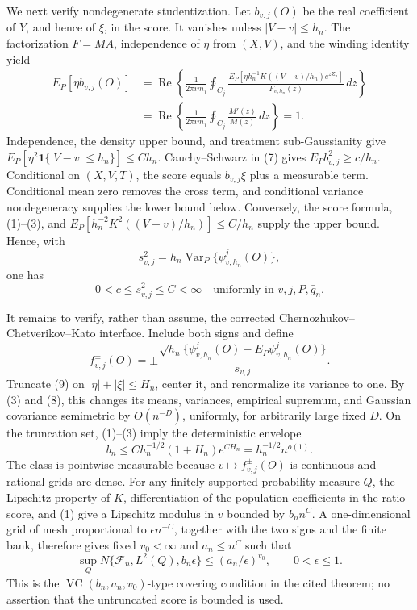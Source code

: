 We next verify nondegenerate studentization.  Let \(b_{v,j}(O)\) be the real coefficient of \(Y\), and hence of \(\xi\), in the score.  It vanishes unless \(|V-v|\le h_n\).  The factorization \(F=MA\), independence of \(\eta\) from \((X,V)\), and the winding identity yield
\[
 \begin{aligned}
 E_P[\eta b_{v,j}(O)]
 &=\operatorname{Re}\left\{\frac1{2\pi i m_j}\oint_{C_j}
 \frac{E_P[\eta h_n^{-1}K((V-v)/h_n)e^{zZ_n}]}{F_{v,h_n}(z)}\,dz\right\}\\
 &=\operatorname{Re}\left\{\frac1{2\pi i m_j}\oint_{C_j}\frac{M'(z)}{M(z)}\,dz\right\}=1.
 \end{aligned} \tag{7}
\]
Independence, the density upper bound, and treatment sub-Gaussianity give
\(E_P[\eta^2\mathbf 1\{|V-v|\le h_n\}]\le Ch_n\).  Cauchy--Schwarz in (7) gives \(E_Pb_{v,j}^2\ge c/h_n\).  Conditional on \((X,V,T)\), the score equals \(b_{v,j}\xi\) plus a measurable term.  Conditional mean zero removes the cross term, and conditional variance nondegeneracy supplies the lower bound below.  Conversely, the score formula, (1)--(3), and
\(E_P[h_n^{-2}K^2((V-v)/h_n)]\le C/h_n\) supply the upper bound.  Hence, with
\[
 s_{v,j}^2=h_n\operatorname{Var}_P\{\psi^j_{v,h_n}(O)\},
\]
one has
\[
 0<c\le s_{v,j}^2\le C<\infty
 \quad\text{uniformly in }v,j,P,\bar g_n. \tag{8}
\]

It remains to verify, rather than assume, the corrected Chernozhukov--Chetverikov--Kato interface.  Include both signs and define
\[
 f_{v,j}^{\pm}(O)=\pm
 \frac{\sqrt{h_n}\{\psi^j_{v,h_n}(O)-E_P\psi^j_{v,h_n}(O)\}}{s_{v,j}}. \tag{9}
\]
Truncate (9) on \(|\eta|+|\xi|\le H_n\), center it, and renormalize its variance to one.  By (3) and (8), this changes its means, variances, empirical supremum, and Gaussian covariance semimetric by \(O(n^{-D})\), uniformly, for arbitrarily large fixed \(D\).  On the truncation set, (1)--(3) imply the deterministic envelope
\[
 b_n\le Ch_n^{-1/2}(1+H_n)e^{CH_n}
 =h_n^{-1/2}n^{o(1)}. \tag{10}
\]
The class is pointwise measurable because \(v\mapsto f_{v,j}^{\pm}(O)\) is continuous and rational grids are dense.  For any finitely supported probability measure \(Q\), the Lipschitz property of \(K\), differentiation of the population coefficients in the ratio score, and (1) give a Lipschitz modulus in \(v\) bounded by \(b_nn^C\).  A one-dimensional grid of mesh proportional to \(\epsilon n^{-C}\), together with the two signs and the finite bank, therefore gives fixed \(v_0<\infty\) and \(a_n\le n^C\) such that
\[
 \sup_QN\{\mathcal F_n,L^2(Q),b_n\epsilon\}
 \le(a_n/\epsilon)^{v_0},
 \qquad 0<\epsilon\le1. \tag{11}
\]
This is the \(\operatorname{VC}(b_n,a_n,v_0)\)-type covering condition in the cited theorem; no assertion that the untruncated score is bounded is used.

